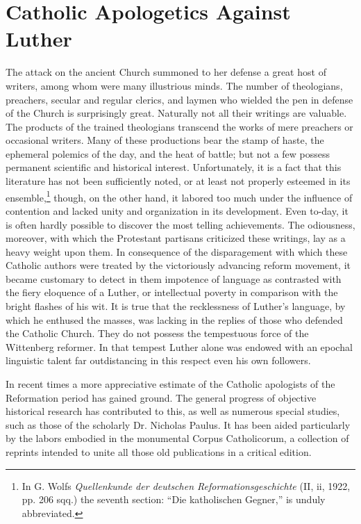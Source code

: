 \section{Catholic Apologetics Against Luther}

The attack on the ancient Church summoned to her defense a
great host of writers, among whom were many illustrious minds.
The number of theologians, preachers, secular and regular clerics, and
laymen who wielded the pen in defense of the Church is surprisingly
great. Naturally not all their writings are valuable. The products
of the trained theologians transcend the works of mere preachers
or occasional writers. Many of these productions bear the stamp of
haste, the ephemeral polemics of the day, and the heat of battle; but
not a few possess permanent scientific and historical interest.
Unfortunately, it is a fact that this literature has not been sufficiently
noted, or at least not properly esteemed in its ensemble,\footnote
{In G. Wolfs \textit{Quellenkunde der deutschen Reformationsgeschichte} (II, ii, 1922, pp. 206
sqq.) the seventh section: “Die katholischen Gegner,” is unduly abbreviated.}
though, on the other hand, it labored too much under the influence
of contention and lacked unity and organization in its development.
Even to-day, it is often hardly possible to discover the most telling
achievements. The odiousness, moreover, with which the Protestant
partisans criticized these writings, lay as a heavy weight upon them.
In consequence of the disparagement with which these Catholic
authors were treated by the victoriously advancing reform movement,
it became customary to detect in them impotence of language
as contrasted with the fiery eloquence of a Luther, or intellectual
poverty in comparison with the bright flashes of his wit. It is true that
the recklessness of Luther’s language, by which he enthused the masses,
was lacking in the replies of those who defended the Catholic Church.
They do not possess the tempestuous force of the Wittenberg reformer.
In that tempest Luther alone was endowed with an epochal
linguistic talent far outdistancing in this respect even his own
followers.

In recent times a more appreciative estimate of the Catholic apologists
of the Reformation period has gained ground. The general
progress of objective historical research has contributed to this, as
well as numerous special studies, such as those of the scholarly Dr.
Nicholas Paulus. It has been aided particularly by the labors embodied
in the monumental Corpus Catholicorum, a collection of reprints
intended to unite all those old publications in a critical edition.

